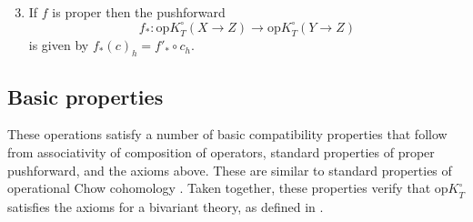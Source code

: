 \documentclass[11pt]{amsart}
\theoremstyle{definition}
\begin{document}
\begin{enumerate}
\setcounter{enumi}{2}
\item If $f$ is proper then the pushforward
\[
f_* \colon {\mathrm{op}K}^\circ_T(X \rightarrow Z) \rightarrow {\mathrm{op}K}^\circ_T(Y \rightarrow Z)
\]
is given by $f_*(c)_h = f'_* \circ c_h$.
\end{enumerate}

\subsection{Basic properties} These operations satisfy a number of basic compatibility properties that follow from associativity of composition of operators, standard properties of proper pushforward, and the axioms above.  These are similar to standard properties of operational Chow cohomology \cite[Section~17.2]{it}.  Taken together, these properties verify that ${\mathrm{op}K}_T^\circ$ satisfies the axioms for a bivariant theory, as defined in \cite[\S2 and \S8]{bt}.
\end{document}
